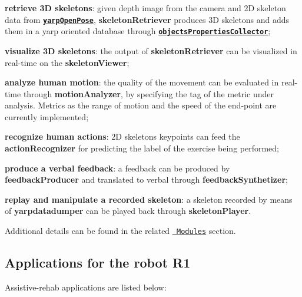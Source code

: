 \begin{DoxyItemize}
\item {\bfseries{retrieve 3D skeletons}}\+: given depth image from the camera and 2D skeleton data from \href{https://github.com/robotology/human-sensing}{\texttt{ {\bfseries{{\ttfamily yarp\+Open\+Pose}}}}}, {\bfseries{{\ttfamily skeleton\+Retriever}}} produces 3D skeletons and adds them in a yarp oriented database through \href{http://www.icub.org/doc/icub-main/group__objectsPropertiesCollector.html}{\texttt{ {\bfseries{{\ttfamily objects\+Properties\+Collector}}}}};
\item {\bfseries{visualize 3D skeletons}}\+: the output of {\bfseries{{\ttfamily skeleton\+Retriever}}} can be visualized in real-\/time on the {\bfseries{{\ttfamily skeleton\+Viewer}}};
\item {\bfseries{analyze human motion}}\+: the quality of the movement can be evaluated in real-\/time through {\bfseries{{\ttfamily motion\+Analyzer}}}, by specifying the tag of the metric under analysis. Metrics as the range of motion and the speed of the end-\/point are currently implemented;
\item {\bfseries{recognize human actions}}\+: 2D skeleton\textquotesingle{}s keypoints can feed the {\bfseries{{\ttfamily action\+Recognizer}}} for predicting the label of the exercise being performed;
\item {\bfseries{produce a verbal feedback}}\+: a feedback can be produced by {\bfseries{{\ttfamily feedback\+Producer}}} and translated to verbal through {\bfseries{{\ttfamily feedback\+Synthetizer}}};
\item {\bfseries{replay and manipulate a recorded skeleton}}\+: a skeleton recorded by means of {\bfseries{{\ttfamily yarpdatadumper}}} can be played back through {\bfseries{{\ttfamily skeleton\+Player}}}.
\end{DoxyItemize}

Additional details can be found in the related \href{https://robotology.github.io/assistive-rehab/doc/doxygen/doc/html/modules.html}{\texttt{ Modules}} section.

\subsection*{Applications for the robot R1}

Assistive-\/rehab applications are listed below\+:


